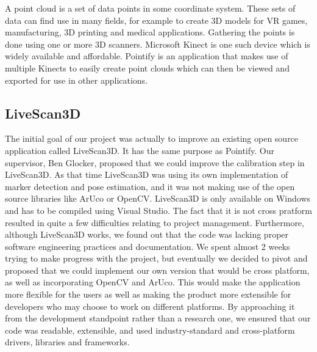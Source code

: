 \documentclass{article}
\begin{document}
A point cloud is a set of data points in some coordinate system. These sets of data can find use in many fields,
for example to create 3D models for VR games, manufacturing, 3D printing and medical applications.
Gathering the points is done using one or more 3D scanners. Microsoft Kinect is one such device which
is widely available and affordable. Pointify is an application that makes use of multiple Kinects to easily
create point clouds which can then be viewed and exported for use in other applications.

\subsection{LiveScan3D}

The initial goal of our project was actually to improve an existing open source application called LiveScan3D.
It has the same purpose as Pointify. Our supervisor, Ben Glocker, proposed that we could
improve the calibration step in LiveScan3D. As that time LiveScan3D was using its own implementation
of marker detection and pose estimation, and it was not making use of the open source libraries like
ArUco or OpenCV. LiveScan3D is only available on Windows and has to be compiled using Visual Studio.
The fact that it is not cross pratform resulted in quite a few difficulties relating to project management.
Furthermore, although LiveScan3D works, we found out that the code was lacking proper software engineering
practices and documentation. We spent almost 2 weeks trying to make progress with the project, but eventually
we decided to pivot and proposed that we could implement our own version that would be cross platform, as well
as incorporating OpenCV and ArUco. This would make the application more flexible for the users
as well as making the product more extensible for developers who may choose to work on different platforms.
By approaching it from the development standpoint rather than a research one, we ensured that our code was readable,
extensible, and used industry-standard and cross-platform drivers, libraries and frameworks.
\end{document}
